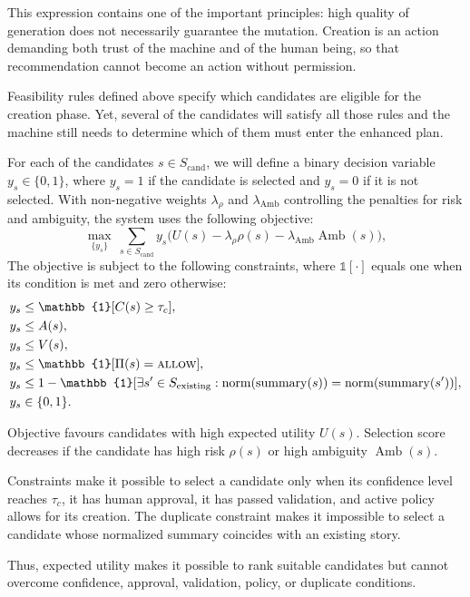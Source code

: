 \documentclass[pdflatex,sn-basic]{sn-jnl}
\begin{document}
This expression contains one of the important principles: high quality of generation does not necessarily guarantee the mutation. Creation is an action demanding both trust of the machine and of the human being, so that recommendation cannot become an action without permission.

Feasibility rules defined above specify which candidates are eligible for the creation phase. Yet, several of the candidates will satisfy all those rules and the machine still needs to determine which of them must enter the enhanced plan.

For each of the candidates $s\in S_{\text{cand}}$, we will define a binary decision variable $y_s\in\{0,1\}$, where $y_s=1$ if the candidate is selected and $y_s=0$ if it is not selected. With non-negative weights $\lambda_\rho$ and $\lambda_{\mathrm{Amb}}$ controlling the penalties for risk and ambiguity, the system uses the following objective:
\begin{equation}
	\max_{\{y_s\}} ~ \sum_{s \in S_{\text{cand}}} y_s
	\Big(
	U(s)-\lambda_\rho\rho(s)
	-\lambda_{\mathrm{Amb}}\operatorname{Amb}(s)
	\Big),
\end{equation}
The objective is subject to the following constraints, where $\mathbb{1}[\cdot]$ equals one when its condition is met and zero otherwise:
\begin{align}
	y_s &\leq \mathbb{1}[C(s)\ge \tau_c], \\
	y_s &\leq A(s), \\
	y_s &\leq V(s), \\
	y_s &\leq \mathbb{1}[\Pi(s)=\textsc{allow}], \\
	y_s &\leq 1-\mathbb{1}[\exists s'\in S_{\text{existing}}:
	\operatorname{norm}(\operatorname{summary}(s))
	=
	\operatorname{norm}(\operatorname{summary}(s'))], \\
	y_s &\in \{0,1\}.
\end{align}

Objective favours candidates with high expected utility $U(s)$. Selection score decreases if the candidate has high risk $\rho(s)$ or high ambiguity $\operatorname{Amb}(s)$.

Constraints make it possible to select a candidate only when its confidence level reaches $\tau_c$, it has human approval, it has passed validation, and active policy allows for its creation. The duplicate constraint makes it impossible to select a candidate whose normalized summary coincides with an existing story.

Thus, expected utility makes it possible to rank suitable candidates but cannot overcome confidence, approval, validation, policy, or duplicate conditions.
\end{document}
